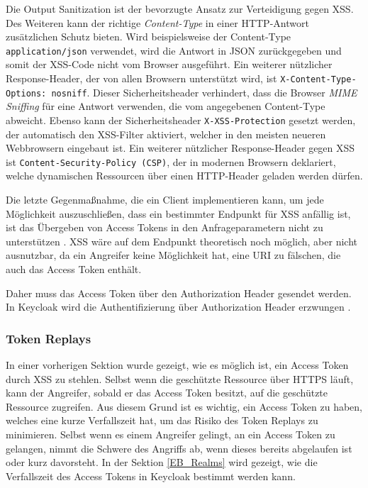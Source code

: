 Die Output Sanitization ist der bevorzugte Ansatz zur Verteidigung gegen XSS. Des Weiteren kann der richtige \textit{Content-Type} in einer HTTP-Antwort zusätzlichen Schutz bieten. Wird beispielsweise der Content-Type \texttt{application/json} verwendet, wird die Antwort in JSON zurückgegeben und somit der XSS-Code nicht vom Browser ausgeführt. Ein weiterer nützlicher Response-Header, der von allen Browsern unterstützt wird, ist \texttt{X-Content-Type-Options: nosniff}. Dieser Sicherheitsheader verhindert, dass die Browser \textit{MIME Sniffing} für eine Antwort verwenden, die vom angegebenen Content-Type abweicht. Ebenso kann der Sicherheitsheader \texttt{X-XSS-Protection} gesetzt werden, der automatisch den XSS-Filter aktiviert, welcher in den meisten neueren Webbrowsern eingebaut ist. Ein weiterer nützlicher Response-Header gegen XSS ist \texttt{Content-Security-Policy (CSP)}, der in modernen Browsern deklariert, welche dynamischen Ressourcen über einen HTTP-Header geladen werden dürfen.

Die letzte Gegenmaßnahme, die ein Client implementieren kann, um jede Möglichkeit auszuschließen, dass ein bestimmter Endpunkt für XSS anfällig ist, ist das Übergeben von Access Tokens in den Anfrageparametern nicht zu unterstützen \cite{SSEB_OAuth2inAction}. XSS wäre auf dem Endpunkt theoretisch noch möglich, aber nicht ausnutzbar, da ein Angreifer keine Möglichkeit hat, eine URI zu fälschen, die auch das Access Token enthält\cite{SSEB_OAuth2inAction}. 

Daher muss das Access Token über den Authorization Header gesendet werden. In Keycloak wird die Authentifizierung über Authorization Header erzwungen \cite{SSEB_keycloakDocs}.


\subsubsection{Token Replays}

In einer vorherigen Sektion wurde gezeigt, wie es möglich ist, ein Access Token durch XSS zu stehlen. Selbst wenn die geschützte Ressource über HTTPS läuft, kann der Angreifer, sobald er das Access Token besitzt, auf die geschützte Ressource zugreifen. Aus diesem Grund ist es wichtig, ein Access Token zu haben, welches eine kurze Verfallszeit hat, um das Risiko des Token Replays zu minimieren. Selbst wenn es einem Angreifer gelingt, an ein Access Token zu gelangen, nimmt die Schwere des Angriffs ab, wenn dieses bereits abgelaufen ist oder kurz davorsteht. In der Sektion \ref{EB_Realms} wird gezeigt, wie die Verfallszeit des Access Tokens in Keycloak bestimmt werden kann.

